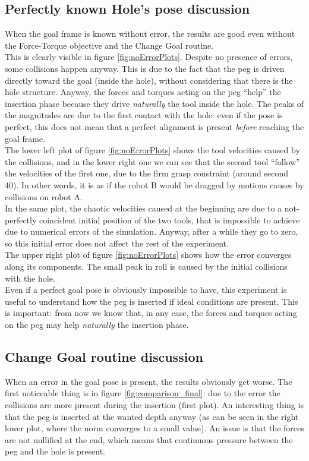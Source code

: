 \subsection{Perfectly known Hole's pose discussion}
When the goal frame is known without error, the results are good even without the Force-Torque objective and the Change Goal routine.\\
This is clearly visible in figure \ref{fig:noErrorPlots}. Despite no presence of errors, some collisions happen anyway. This is due to the fact that the peg is driven  directly toward the goal (inside the hole), without considering that there is the hole structure. Anyway, the forces and torques acting on the peg \enquote{help} the insertion phase because they drive \textit{naturally} the tool inside the hole. The peaks of the magnitudes are due to the first contact with the hole: even if the pose is perfect, this does not mean that a perfect alignment is present \textit{before} reaching the goal frame.\\
 
The lower left plot of figure \ref{fig:noErrorPlots} shows the tool velocities caused by the collisions, and in the lower right one we can see that the second tool \enquote{follow} the velocities of the first one, due to the firm grasp constraint (around second 40). In other words, it is as if the robot B would be dragged by motions causes by collisions on robot A.\\
In the same plot, the chaotic velocities caused at the beginning are due to a not-perfectly coincident initial position of the two tools, that is impossible to achieve due to numerical errors of the simulation. Anyway, after a while they go to zero, so this initial error does not affect the rest of the experiment.\\

The upper right plot of figure \ref{fig:noErrorPlots} shows how the error converges along its components. The small peak in roll is caused by the initial collisions with the hole.\\

Even if a perfect goal pose is obviously impossible to have, this experiment is useful to understand how the peg is inserted if ideal conditions are present. This is important: from now we know that, in any case, the forces and torques acting on the peg may help \textit{naturally} the insertion phase.\\

\subsection{Change Goal routine discussion}
When an error in the goal pose is present, the results obviously get worse. The first noticeable thing is in figure \ref{fig:comparison_final}: due to the error the collisions are more present during the insertion (first plot). An interesting thing is that the peg is inserted at the wanted depth anyway (as can be seen in the right lower plot, where the norm converges to a small value). An issue is that the forces are not nullified at the end, which means that continuous pressure between the peg and the hole is present.\\

